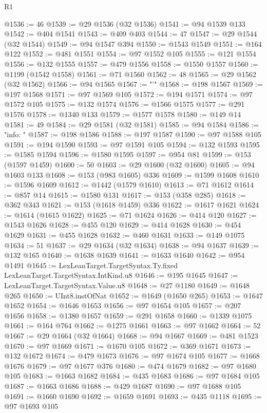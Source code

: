 \begin{lexlean}{R1}
\begin{coremodule}
@1536 := 46
@1539 := @29 @1536 (@32 @1536)
@1541 := @94 @1539 @133
@1542 := @404 @1541
@1543 := @409 @403
@1544 := 47
@1547 := @29 @1544 (@32 @1544)
@1549 := @94 @1547 @394
@1550 := @1543 @1549
@1551 := @164 @122
@1552 := @481 @1551
@1554 := @97 @1552 @105
@1555 := @121 @1554
@1556 := @132 @1555
@1557 := @479 @1556
@1558 := @1550 @1557
@1560 := @1199 (@1542 @1558)
@1561 := @71 @1560
@1562 := 48
@1565 := @29 @1562 (@32 @1562)
@1566 := @94 @1565
@1567 := "'"
@1568 := @198 @1567
@1569 := @197 @1568
@1571 := @97 @1569 @105
@1572 := @194 @1571
@1574 := @97 @1572 @105
@1575 := @132 @1574
@1576 := @1566 @1575
@1577 := @291 @1576
@1578 := @1340 @133
@1579 := @1577 @1578
@1580 := @149 @14
@1581 := 49
@1584 := @29 @1581 (@32 @1581)
@1585 := @94 @1584
@1586 := "info: "
@1587 := @198 @1586
@1588 := @197 @1587
@1590 := @97 @1588 @105
@1591 := @194 @1590
@1593 := @97 @1591 @105
@1594 := @132 @1593
@1595 := @1585 @1594
@1596 := @1580 @1595
@1597 := @954 @81
@1599 := @153 (@1597 @1459)
@1600 := 50
@1603 := @29 @1600 (@32 @1600)
@1605 := @94 @1603 @133
@1608 := @153 (@983 @1605) @336
@1609 := @1599 @1608
@1610 := @1596 @1609
@1612 := @1442 (@1579 @1610)
@1613 := @71 @1612
@1614 := @857 @14
@1615 := @1580 @131
@1617 := @153 (@358 @285)
@1618 := @362 @343
@1621 := @153 (@1618 @1459) @336
@1622 := @1617 @1621
@1624 := @1614 (@1615 @1622)
@1625 := @71 @1624
@1626 := @414 @120
@1627 := @1543 @1626
@1628 := @455 @120
@1629 := @414 @1628
@1630 := @454 @1629
@1631 := @455 @1628
@1632 := @460 @1631
@1633 := @149 @1075
@1634 := 51
@1637 := @29 @1634 (@32 @1634)
@1638 := @94 @1637
@1639 := @132 @165
@1640 := @1638 @1639
@1641 := @1633 @1640
@1642 := @954 @1491
@1645 := LexLeanTarget.TargetSyntax.Ty.fixed LexLeanTarget.TargetSyntax.IntKind.u8
@1646 := @195 @1645
@1647 := LexLeanTarget.TargetSyntax.Value.u8
@1648 := @27 @1180
@1649 := @1648 @265
@1650 := UInt8.instOfNat
@1652 := @1649 (@1650 @265)
@1653 := @1647 @1652
@1654 := @1646 @1653
@1656 := @97 @1654 @105
@1657 := @207 @1656
@1658 := @1380 @1657
@1659 := @291 @1658
@1660 := @1339 @1075
@1661 := @164 @764
@1662 := @1275 @1661
@1663 := @97 @1662
@1664 := 52
@1667 := @29 @1664 (@32 @1664)
@1668 := @94 @1667
@1669 := @481 @1523
@1670 := @97 @1669
@1671 := @1670 @105
@1672 := @369 @1671
@1673 := @132 @1672
@1674 := @479 @1673
@1676 := @97 @1674 @105
@1677 := @1668 @1676
@1679 := @97 @1677 @376
@1680 := @474 @1679
@1682 := @97 @1680 @105
@1683 := @1663 @1682
@1684 := @435 @1683
@1686 := @97 @1684 @105
@1687 := @1663 @1686
@1688 := @429 @1687
@1690 := @97 @1688 @105
@1691 := @1660 @1690
@1692 := @1659 @1691
@1693 := @435 @1118
@1695 := @97 @1693 @105

\end{coremodule}
\end{lexlean}
